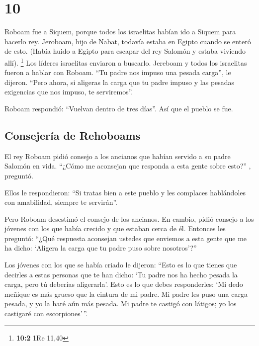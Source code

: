 \hypertarget{section-9}{%
\section{10}\label{section-9}}

 Roboam fue a Siquem, porque todos los israelitas habían
ido a Siquem para hacerlo rey.  Jeroboam, hijo de Nabat,
todavía estaba en Egipto cuando se enteró de esto. (Había huido a Egipto
para escapar del rey Salomón y estaba viviendo allí). \footnote{\textbf{10:2}
  1Re 11,40}  Los líderes israelitas enviaron a buscarlo.
Jereboam y todos los israelitas fueron a hablar con Roboam.
 ``Tu padre nos impuso una pesada carga'', le dijeron.
``Pero ahora, si aligeras la carga que tu padre impuso y las pesadas
exigencias que nos impuso, te serviremos''.

 Roboam respondió: ``Vuelvan dentro de tres días''. Así
que el pueblo se fue.

\hypertarget{consejeruxeda-de-rehoboams}{%
\subsection{Consejería de Rehoboams}\label{consejeruxeda-de-rehoboams}}

 El rey Roboam pidió consejo a los ancianos que habían
servido a su padre Salomón en vida. ``¿Cómo me aconsejan que responda a
esta gente sobre esto?'' , preguntó.

 Ellos le respondieron: ``Si tratas bien a este pueblo y
les complaces hablándoles con amabilidad, siempre te servirán''.

 Pero Roboam desestimó el consejo de los ancianos. En
cambio, pidió consejo a los jóvenes con los que había crecido y que
estaban cerca de él.  Entonces les preguntó: ``¿Qué
respuesta aconsejan ustedes que enviemos a esta gente que me ha dicho:
`Aligera la carga que tu padre puso sobre nosotros'?''

 Los jóvenes con los que se había criado le dijeron:
``Esto es lo que tienes que decirles a estas personas que te han dicho:
`Tu padre nos ha hecho pesada la carga, pero tú deberías aligerarla'.
Esto es lo que debes responderles: `Mi dedo meñique es más grueso que la
cintura de mi padre.  Mi padre les puso una carga pesada,
y yo la haré aún más pesada. Mi padre te castigó con látigos; yo los
castigaré con escorpiones'\,''.

